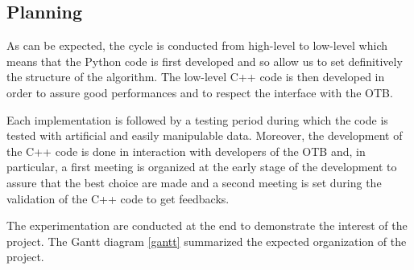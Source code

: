 \documentclass[a4paper,11pt,DIV=16]{scrartcl}
\begin{document}
    \subsection{Planning}

    As can be expected, the cycle is conducted from high-level to low-level which means that the Python code is first developed and so allow us to set definitively the structure of the algorithm. The low-level C++ code is then developed in order to assure good performances and to respect the interface with the OTB.

    Each implementation is followed by a testing period during which the code is tested with artificial and easily manipulable data. Moreover, the development of the C++ code is done in interaction with developers of the OTB and, in particular, a first meeting is organized at the early stage of the development to assure that the best choice are made and a second meeting is set during the validation of the C++ code to get feedbacks.

    The experimentation are conducted at the end to demonstrate the interest of the project. The Gantt diagram \ref{gantt} summarized the expected organization of the project.
\end{document}
